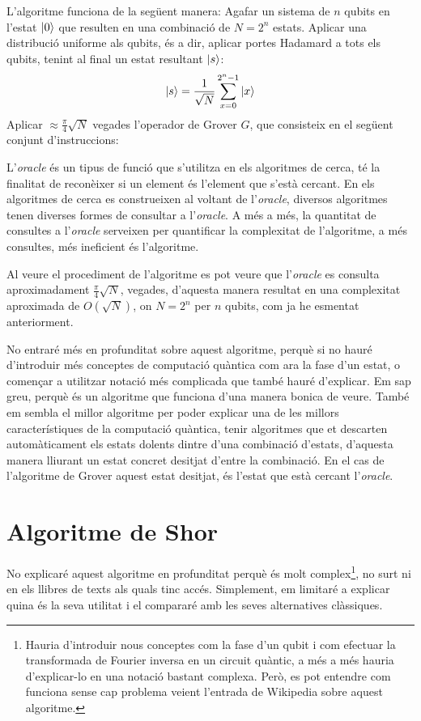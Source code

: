 L'algoritme funciona de la següent manera:
Agafar un sistema de $n$ qubits en l'estat $\ket{0}$ que resulten en una combinació de $N = 2^n$ estats. Aplicar una distribució uniforme als qubits, és a dir, aplicar portes Hadamard a tots els qubits, tenint al final un estat resultant $\ket{s}$:
\begin{equation*}
	\ket{s} = \frac{1}{\sqrt{N}} \sum_{x=0}^{2^n-1} \ket{x}
\end{equation*}
Aplicar $\approx \frac{\pi}{4}\sqrt{N}$ vegades l'operador de Grover $G$, que consisteix en el següent conjunt d'instruccions:
\begin{algorithmic}[1]
\end{algorithmic}


L'\textit{oracle} és un tipus de funció que s'utilitza en els algoritmes de cerca, té la finalitat de reconèixer si un element és l'element que s'està cercant. En els algoritmes de cerca es construeixen al voltant de l'\textit{oracle}, diversos algoritmes tenen diverses formes de consultar a l'\textit{oracle}. A més a més, la quantitat de consultes a l'\textit{oracle} serveixen per quantificar la complexitat de l'algoritme, a més consultes, més ineficient és l'algoritme.

Al veure el procediment de l'algoritme es pot veure que l'\textit{oracle} es consulta aproximadament $\frac{\pi}{4}\sqrt{N}$, vegades, d'aquesta manera resultat en una complexitat aproximada de $O(\sqrt{N})$, on $N=2^{n}$ per $n$ qubits, com ja he esmentat anteriorment.

No entraré més en profunditat sobre aquest algoritme, perquè si no hauré d'introduir més conceptes de computació quàntica com ara la fase d'un estat, o començar a utilitzar notació més complicada que també hauré d'explicar. Em sap greu, perquè és un algoritme que funciona d'una manera bonica de veure. També em sembla el millor algoritme per poder explicar una de les millors característiques de la computació quàntica, tenir algoritmes que et descarten automàticament els estats dolents dintre d'una combinació d'estats, d'aquesta manera lliurant un estat concret desitjat d'entre la combinació. En el cas de l'algoritme de Grover aquest estat desitjat, és l'estat que està cercant l'\textit{oracle}.

\section{Algoritme de Shor}
No explicaré aquest algoritme en profunditat perquè és molt complex\footnote{Hauria d'introduir nous conceptes com la fase d'un qubit i com efectuar la transformada de Fourier inversa en un circuit quàntic, a més a més hauria d'explicar-lo en una notació bastant complexa. Però, es pot entendre com funciona sense cap problema veient l'entrada de Wikipedia sobre aquest algoritme.}, no surt ni en els llibres de texts als quals tinc accés. Simplement, em limitaré a explicar quina és la seva utilitat i el compararé amb les seves alternatives clàssiques.

